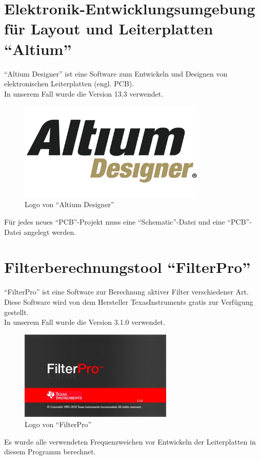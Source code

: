 \newpage
\section{Elektronik-Entwicklungsumgebung für Layout und Leiterplatten \enquote{Altium}} \label{sec:3.1}
\enquote{Altium Designer} ist eine Software zum Entwickeln und Designen von elektronischen Leiterplatten (engl. PCB).\\
In unserem Fall wurde die Version 13.3 verwendet. 
\begin{figure} [H]
	\centering
	\includegraphics[width=0.8\textwidth]{img/Grundlagen/Altium/ad_logo.png}
	\caption[Logo von \enquote{Altium Designer}]{Logo von \enquote{Altium Designer}\footnotemark}
	\label{fig:3.1.1}
\end{figure}
Für jedes neues \enquote{PCB}-Projekt muss eine \enquote{Schematic}-Datei und eine \enquote{PCB}-Datei angelegt werden.

\newpage
\section{Filterberechnungstool \enquote{FilterPro}}\label{sec:6.2}
\enquote{FilterPro} ist eine Software zur Berechnung aktiver Filter verschiedener Art.
Diese Software wird von dem Hersteller TexasInstruments gratis zur Verfügung gestellt.\\
In unserem Fall wurde die Version 3.1.0 verwendet. 
\begin{figure} [H]
	\centering
	\includegraphics[width=0.65\textwidth]{img/VerwendeteTools/FilterPro.jpg}
	\caption[Logo von \enquote{FilterPro}]{Logo von \enquote{FilterPro}}
	\label{fig:6.2.1}
\end{figure}
Es wurde alle verwendeten Frequenzweichen vor Entwickeln der Leiterplatten in diesem Programm berechnet.
